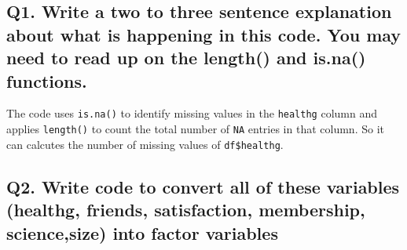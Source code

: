 \documentclass[
]{article}
\newenvironment{Shaded}{\begin{snugshade}}{\end{snugshade}}
\newcommand{\CommentTok}[1]{\textcolor[rgb]{0.56,0.35,0.01}{\textit{#1}}}
\newcommand{\ConstantTok}[1]{\textcolor[rgb]{0.56,0.35,0.01}{#1}}
\newcommand{\ControlFlowTok}[1]{\textcolor[rgb]{0.13,0.29,0.53}{\textbf{#1}}}
\newcommand{\DecValTok}[1]{\textcolor[rgb]{0.00,0.00,0.81}{#1}}
\newcommand{\FunctionTok}[1]{\textcolor[rgb]{0.13,0.29,0.53}{\textbf{#1}}}
\newcommand{\NormalTok}[1]{#1}
\newcommand{\OtherTok}[1]{\textcolor[rgb]{0.56,0.35,0.01}{#1}}
\newcommand{\SpecialCharTok}[1]{\textcolor[rgb]{0.81,0.36,0.00}{\textbf{#1}}}
\begin{document}
\begin{Shaded}
\end{Shaded}

\subsection{Q1. Write a two to three sentence explanation about what is
happening in this code. You may need to read up on the length() and
is.na()
functions.}\label{q1.-write-a-two-to-three-sentence-explanation-about-what-is-happening-in-this-code.-you-may-need-to-read-up-on-the-length-and-is.na-functions.}

The code uses \texttt{is.na()} to identify missing values in the
\texttt{healthg} column and applies \texttt{length()} to count the total
number of \texttt{NA} entries in that column. So it can calcutes the
number of missing values of \texttt{df\$healthg}.

\begin{Shaded}
\end{Shaded}

\subsection{Q2. Write code to convert all of these variables (healthg,
friends, satisfaction, membership, science,size) into factor
variables}\label{q2.-write-code-to-convert-all-of-these-variables-healthg-friends-satisfaction-membership-sciencesize-into-factor-variables}
\end{document}

